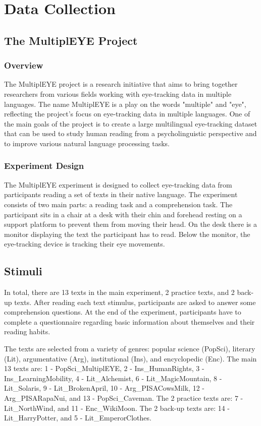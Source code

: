 \chapter{Data Collection}

\section{The MultiplEYE Project}

\subsection{Overview}
The MultiplEYE project is a research initiative that aims to bring together researchers from various fields working with eye-tracking data in multiple languages. The name MultiplEYE is a play on the words "multiple" and "eye", reflecting the project's focus on eye-tracking data in multiple languages. One of the main goals of the project is to create a large multilingual eye-tracking dataset that can be used to study human reading from a psycholinguistic perspective and to improve various natural language processing tasks.

\subsection{Experiment Design}
The MultiplEYE experiment is designed to collect eye-tracking data from participants reading a set of texts in their native language. The experiment consists of two main parts: a reading task and a comprehension task. The participant sits in a chair at a desk with their chin and forehead resting on a support platform to prevent them from moving their head. On the desk there is a monitor displaying the text the participant has to read. Below the monitor, the eye-tracking device is tracking their eye movements. 

\section{Stimuli}
In total, there are 13 texts in the main experiment, 2 practice texts, and 2 back-up texts. After reading each text stimulus, participants are asked to answer some comprehension questions. At the end of the experiment, participants have to complete a questionnaire regarding basic information about themselves and their reading habits.

The texts are selected from a variety of genres: popular science (PopSci), literary (Lit), argumentative (Arg), institutional (Ins), and encyclopedic (Enc). The main 13 texts are: 1 - PopSci\_MultiplEYE, 2 - Ins\_HumanRights, 3 - Ins\_LearningMobility, 4 - Lit\_Alchemist, 6 - Lit\_MagicMountain, 8 - Lit\_Solaris, 9 - Lit\_BrokenApril, 10 - Arg\_PISACowsMilk, 12 - Arg\_PISARapaNui, and 13 - PopSci\_Caveman. The 2 practice texts are: 7 - Lit\_NorthWind, and 11 - Enc\_WikiMoon. The 2 back-up texts are: 14 - Lit\_HarryPotter, and 5 - Lit\_EmperorClothes.

